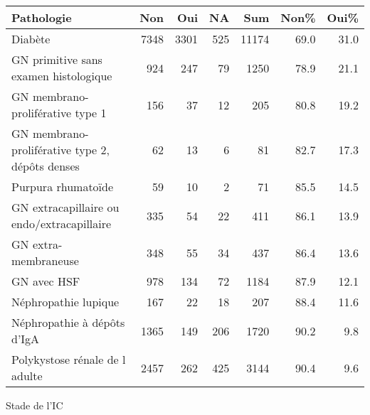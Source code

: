 \documentclass[11pt,a4paper]{article}\usepackage[]{graphicx}\usepackage[]{color}
\begin{document}
\begin{table}[H]
\centering
\begin{tabular}{lrrrrrr}
  \hline
Pathologie & Non & Oui & NA & Sum & Non\% & Oui\% \\ 
  \hline
Diabète & 7348 & 3301 & 525 & 11174 & 69.0 & 31.0 \\ 
  GN primitive sans examen histologique & 924 & 247 & 79 & 1250 & 78.9 & 21.1 \\ 
  GN membrano-proliférative type 1 & 156 & 37 & 12 & 205 & 80.8 & 19.2 \\ 
  GN membrano-proliférative type 2, dépôts denses & 62 & 13 &  6 & 81 & 82.7 & 17.3 \\ 
  Purpura rhumatoïde & 59 & 10 &  2 & 71 & 85.5 & 14.5 \\ 
  GN extracapillaire ou endo/extracapillaire & 335 & 54 & 22 & 411 & 86.1 & 13.9 \\ 
  GN extra-membraneuse & 348 & 55 & 34 & 437 & 86.4 & 13.6 \\ 
  GN avec HSF & 978 & 134 & 72 & 1184 & 87.9 & 12.1 \\ 
  Néphropathie lupique & 167 & 22 & 18 & 207 & 88.4 & 11.6 \\ 
  Néphropathie à dépôts d'IgA & 1365 & 149 & 206 & 1720 & 90.2 & 9.8 \\ 
  Polykystose rénale de l adulte & 2457 & 262 & 425 & 3144 & 90.4 & 9.6 \\ 
   \hline
\end{tabular}
\end{table}


Stade de l’IC
\end{document}
